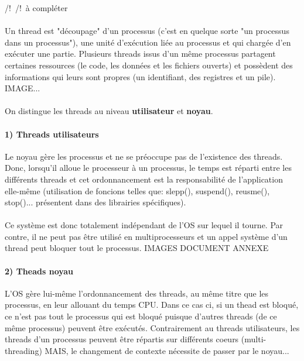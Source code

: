 \item{}
{
/!\ /!\ à compléter
\paragraph{}
Un thread est "découpage" d'un processus  (c'est en quelque sorte "un processus dans un processus"), une unité d'exécution liée au processus et qui chargée d'en exécuter une partie. Plusieurs threads issus d'un même processus partagent certaines ressources (le code, les données et les fichiers ouverts) et possèdent des informations qui leurs sont propres (un identifiant, des registres et un pile). IMAGE...

\paragraph{}
On distingue les threads au niveau \textbf{utilisateur} et \textbf{noyau}.


\paragraph{1) Threads utilisateurs}
Le noyau gère les processus et  ne se préoccupe pas de l'existence des threads. Donc, lorsqu'il alloue le processeur à un processus, le temps est réparti entre les différents threads et cet ordonnancement est la responsabilité de l'application elle-même (utilisation de foncions telles que: slepp(), suspend(), reusme(), stop()... présentent dans des librairies spécifiques).
\paragraph{}
Ce système est donc totalement indépendant de l'OS sur lequel il tourne. Par contre, il ne peut pas être utilisé en multiprocesseurs et un appel système d'un thread peut bloquer tout le processus.
IMAGES DOCUMENT ANNEXE

\paragraph{2) Theads noyau}
L'OS gère lui-même l'ordonnancement des threads, au même titre que les processus, en leur allouant du temps CPU. Dans ce cas ci, si un thead est bloqué, ce n'est pas tout le processus qui est bloqué puisque d'autres threads (de ce même processus) peuvent être exécutés. Contrairement au threads utilisateurs, les threads d'un processus peuvent être répartis sur différents coeurs (multi-threading) MAIS, le changement de contexte nécessite de passer par le noyau...
}


